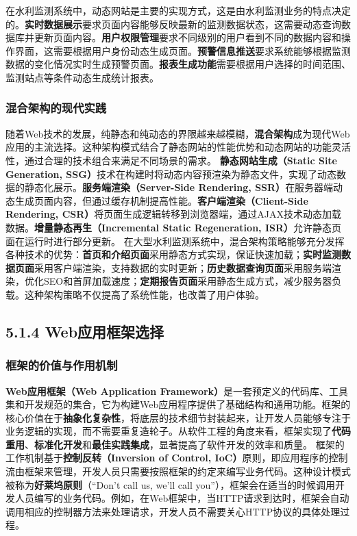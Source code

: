在水利监测系统中，动态网站是主要的实现方式，这是由水利监测业务的特点决定的。\textbf{实时数据展示}要求页面内容能够反映最新的监测数据状态，这需要动态查询数据库并更新页面内容。\textbf{用户权限管理}要求不同级别的用户看到不同的数据内容和操作界面，这需要根据用户身份动态生成页面。\textbf{预警信息推送}要求系统能够根据监测数据的变化情况实时生成预警页面。\textbf{报表生成功能}需要根据用户选择的时间范围、监测站点等条件动态生成统计报表。 \subsubsection{混合架构的现代实践}\label{ux6df7ux5408ux67b6ux6784ux7684ux73b0ux4ee3ux5b9eux8df5} 随着Web技术的发展，纯静态和纯动态的界限越来越模糊，\textbf{混合架构}成为现代Web应用的主流选择。这种架构模式结合了静态网站的性能优势和动态网站的功能灵活性，通过合理的技术组合来满足不同场景的需求。 \textbf{静态网站生成（Static Site Generation, SSG）}技术在构建时将动态内容预渲染为静态文件，实现了动态数据的静态化展示。\textbf{服务端渲染（Server-Side Rendering, SSR）}在服务器端动态生成页面内容，但通过缓存机制提高性能。\textbf{客户端渲染（Client-Side Rendering, CSR）}将页面生成逻辑转移到浏览器端，通过AJAX技术动态加载数据。\textbf{增量静态再生（Incremental Static Regeneration, ISR）}允许静态页面在运行时进行部分更新。 在大型水利监测系统中，混合架构策略能够充分发挥各种技术的优势：\textbf{首页和介绍页面}采用静态方式实现，保证快速加载；\textbf{实时监测数据页面}采用客户端渲染，支持数据的实时更新；\textbf{历史数据查询页面}采用服务端渲染，优化SEO和首屏加载速度；\textbf{定期报告页面}采用静态生成方式，减少服务器负载。这种架构策略不仅提高了系统性能，也改善了用户体验。 \subsection{5.1.4 Web应用框架选择}\label{webux5e94ux7528ux6846ux67b6ux9009ux62e9} \subsubsection{框架的价值与作用机制}\label{ux6846ux67b6ux7684ux4ef7ux503cux4e0eux4f5cux7528ux673aux5236} \textbf{Web应用框架（Web Application Framework）}是一套预定义的代码库、工具集和开发规范的集合，它为构建Web应用程序提供了基础结构和通用功能。框架的核心价值在于\textbf{抽象化复杂性}，将底层的技术细节封装起来，让开发人员能够专注于业务逻辑的实现，而不需要重复造轮子。从软件工程的角度来看，框架实现了\textbf{代码重用}、\textbf{标准化开发}和\textbf{最佳实践集成}，显著提高了软件开发的效率和质量。 框架的工作机制基于\textbf{控制反转（Inversion of Control, IoC）}原则，即应用程序的控制流由框架来管理，开发人员只需要按照框架的约定来编写业务代码。这种设计模式被称为\textbf{好莱坞原则}（``Don't call us, we'll call you''），框架会在适当的时候调用开发人员编写的业务代码。例如，在Web框架中，当HTTP请求到达时，框架会自动调用相应的控制器方法来处理请求，开发人员不需要关心HTTP协议的具体处理过程。 